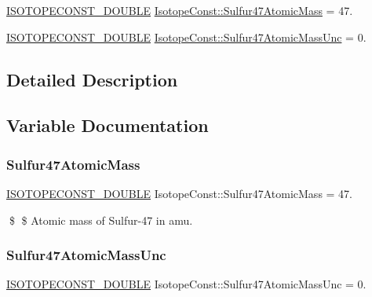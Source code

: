 \begin{DoxyCompactItemize}
\item 
\mbox{\hyperlink{group___isotope_const-_macros_ga8f45a7272ce02c0b4c65c44636ed719a}{I\+S\+O\+T\+O\+P\+E\+C\+O\+N\+S\+T\+\_\+\+D\+O\+U\+B\+LE}} \mbox{\hyperlink{group___isotope_const-_sulfur-_s47_ga38a99c2dbd0f2f7b60620bdbca81b75d}{Isotope\+Const\+::\+Sulfur47\+Atomic\+Mass}} = 47.
\item 
\mbox{\hyperlink{group___isotope_const-_macros_ga8f45a7272ce02c0b4c65c44636ed719a}{I\+S\+O\+T\+O\+P\+E\+C\+O\+N\+S\+T\+\_\+\+D\+O\+U\+B\+LE}} \mbox{\hyperlink{group___isotope_const-_sulfur-_s47_ga6699be9e911ba2d7ded6add5f15b8ead}{Isotope\+Const\+::\+Sulfur47\+Atomic\+Mass\+Unc}} = 0.
\end{DoxyCompactItemize}


\subsection{Detailed Description}


\subsection{Variable Documentation}
\mbox{\label{group___isotope_const-_sulfur-_s47_ga38a99c2dbd0f2f7b60620bdbca81b75d}} 
\subsubsection{\texorpdfstring{Sulfur47\+Atomic\+Mass}{Sulfur47AtomicMass}}
{\footnotesize\ttfamily \mbox{\hyperlink{group___isotope_const-_macros_ga8f45a7272ce02c0b4c65c44636ed719a}{I\+S\+O\+T\+O\+P\+E\+C\+O\+N\+S\+T\+\_\+\+D\+O\+U\+B\+LE}} Isotope\+Const\+::\+Sulfur47\+Atomic\+Mass = 47.}

\$ \$ Atomic mass of Sulfur-\/47 in amu. \mbox{\label{group___isotope_const-_sulfur-_s47_ga6699be9e911ba2d7ded6add5f15b8ead}} 
\subsubsection{\texorpdfstring{Sulfur47\+Atomic\+Mass\+Unc}{Sulfur47AtomicMassUnc}}
{\footnotesize\ttfamily \mbox{\hyperlink{group___isotope_const-_macros_ga8f45a7272ce02c0b4c65c44636ed719a}{I\+S\+O\+T\+O\+P\+E\+C\+O\+N\+S\+T\+\_\+\+D\+O\+U\+B\+LE}} Isotope\+Const\+::\+Sulfur47\+Atomic\+Mass\+Unc = 0.}

